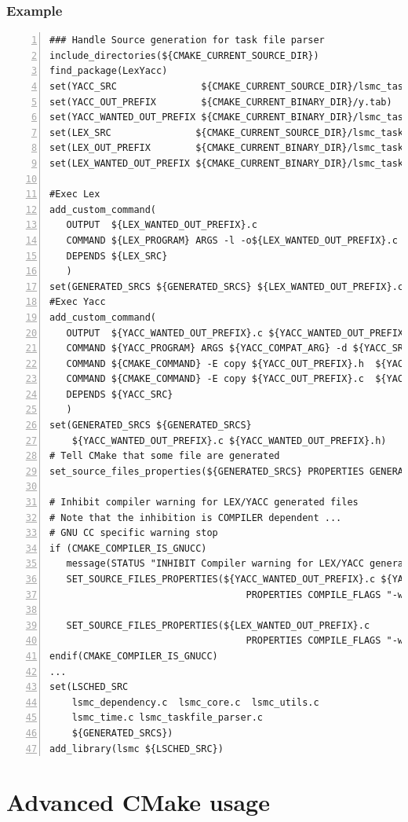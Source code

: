 \documentclass[compress,slidestop,table,usepdftitle=false
              ]
               {beamer}
\begin{document}
\begin{frame}
\frametitle{Example}
\begin{lstlisting}[basicstyle=\tiny,numbers=left]
### Handle Source generation for task file parser
include_directories(${CMAKE_CURRENT_SOURCE_DIR})
find_package(LexYacc)
set(YACC_SRC               ${CMAKE_CURRENT_SOURCE_DIR}/lsmc_taskfile_syntax.yy)
set(YACC_OUT_PREFIX        ${CMAKE_CURRENT_BINARY_DIR}/y.tab)
set(YACC_WANTED_OUT_PREFIX ${CMAKE_CURRENT_BINARY_DIR}/lsmc_taskfile_syntax)
set(LEX_SRC               ${CMAKE_CURRENT_SOURCE_DIR}/lsmc_taskfile_tokens.ll)
set(LEX_OUT_PREFIX        ${CMAKE_CURRENT_BINARY_DIR}/lsmc_taskfile_tokens_yy)
set(LEX_WANTED_OUT_PREFIX ${CMAKE_CURRENT_BINARY_DIR}/lsmc_taskfile_tokens)

#Exec Lex
add_custom_command(
   OUTPUT  ${LEX_WANTED_OUT_PREFIX}.c
   COMMAND ${LEX_PROGRAM} ARGS -l -o${LEX_WANTED_OUT_PREFIX}.c ${LEX_SRC}
   DEPENDS ${LEX_SRC}
   )
set(GENERATED_SRCS ${GENERATED_SRCS} ${LEX_WANTED_OUT_PREFIX}.c)
#Exec Yacc
add_custom_command(
   OUTPUT  ${YACC_WANTED_OUT_PREFIX}.c ${YACC_WANTED_OUT_PREFIX}.h
   COMMAND ${YACC_PROGRAM} ARGS ${YACC_COMPAT_ARG} -d ${YACC_SRC}
   COMMAND ${CMAKE_COMMAND} -E copy ${YACC_OUT_PREFIX}.h  ${YACC_WANTED_OUT_PREFIX}.h
   COMMAND ${CMAKE_COMMAND} -E copy ${YACC_OUT_PREFIX}.c  ${YACC_WANTED_OUT_PREFIX}.c
   DEPENDS ${YACC_SRC}
   )
set(GENERATED_SRCS ${GENERATED_SRCS}
    ${YACC_WANTED_OUT_PREFIX}.c ${YACC_WANTED_OUT_PREFIX}.h)
# Tell CMake that some file are generated
set_source_files_properties(${GENERATED_SRCS} PROPERTIES GENERATED TRUE)

# Inhibit compiler warning for LEX/YACC generated files
# Note that the inhibition is COMPILER dependent ...
# GNU CC specific warning stop
if (CMAKE_COMPILER_IS_GNUCC)
   message(STATUS "INHIBIT Compiler warning for LEX/YACC generated files")
   SET_SOURCE_FILES_PROPERTIES(${YACC_WANTED_OUT_PREFIX}.c ${YACC_WANTED_OUT_PREFIX}.h
                                   PROPERTIES COMPILE_FLAGS "-w")

   SET_SOURCE_FILES_PROPERTIES(${LEX_WANTED_OUT_PREFIX}.c
                                   PROPERTIES COMPILE_FLAGS "-w")
endif(CMAKE_COMPILER_IS_GNUCC)
...
set(LSCHED_SRC
    lsmc_dependency.c  lsmc_core.c  lsmc_utils.c
    lsmc_time.c lsmc_taskfile_parser.c
    ${GENERATED_SRCS})
add_library(lsmc ${LSCHED_SRC})
\end{lstlisting}
\end{frame}

\section{Advanced CMake usage}
\end{document}

